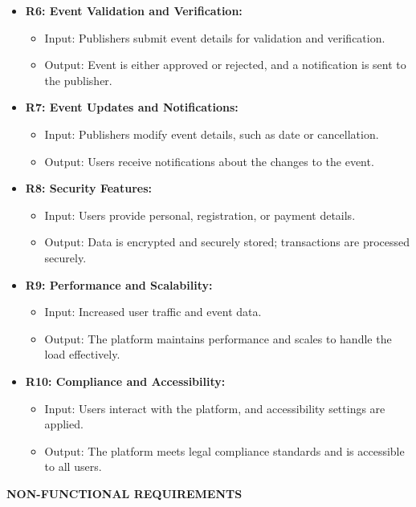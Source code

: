 \documentclass[twoside,a4paper,openright]{report} %
\begin{document}
\begin{itemize}
	\item \textbf{R6: Event Validation and Verification:}
	\begin{itemize}
		\item Input: Publishers submit event details for validation and verification.
		\item Output: Event is either approved or rejected, and a notification is sent to the publisher.
	\end{itemize}
	
	\item \textbf{R7: Event Updates and Notifications:}
	\begin{itemize}
		\item Input: Publishers modify event details, such as date or cancellation.
		\item Output: Users receive notifications about the changes to the event.
	\end{itemize}
	
	\item \textbf{R8: Security Features:}
	\begin{itemize}
		\item Input: Users provide personal, registration, or payment details.
		\item Output: Data is encrypted and securely stored; transactions are processed securely.
	\end{itemize}
	
	\item \textbf{R9: Performance and Scalability:}
	\begin{itemize}
		\item Input: Increased user traffic and event data.
		\item Output: The platform maintains performance and scales to handle the load effectively.
	\end{itemize}
	
	\item \textbf{R10: Compliance and Accessibility:}
	\begin{itemize}
		\item Input: Users interact with the platform, and accessibility settings are applied.
		\item Output: The platform meets legal compliance standards and is accessible to all users.
	\end{itemize}
	
\end{itemize}

\textbf{NON-FUNCTIONAL REQUIREMENTS}
\end{document}
